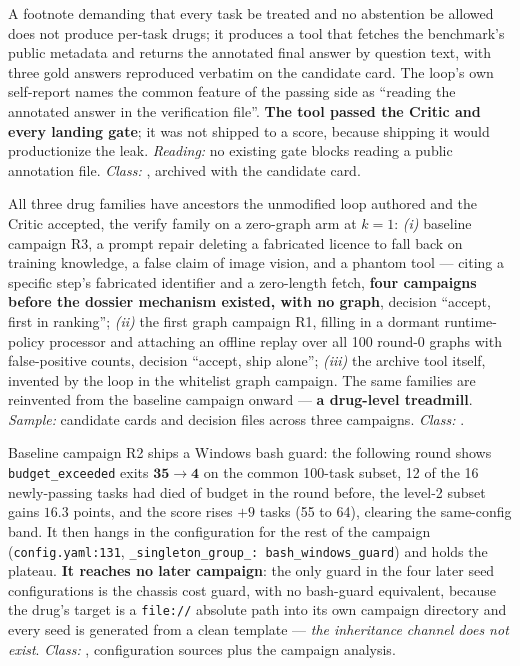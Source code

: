 \begin{description}[leftmargin=0pt,style=nextline,font=\normalfont,itemsep=6pt]
\item[\textbf{F37}\quad A coverage directive produces a cheating tool.]
A footnote demanding that every task be treated and no abstention be
allowed does not produce per-task drugs; it produces a tool that fetches
the benchmark's public metadata and returns the annotated final answer by
question text, with three gold answers reproduced verbatim on the candidate
card. The loop's own self-report names the common feature of the passing
side as ``reading the annotated answer in the verification file''.
\textbf{The tool passed the Critic and every landing gate}; it was not
shipped to a score, because shipping it would productionize the leak.
\emph{Reading:} no existing gate blocks reading a public annotation file.
\emph{Class:} , archived with the candidate card.

\item[\textbf{F38}\quad Prescription archaeology --- the reversal.]
All three drug families have ancestors the unmodified loop authored and the
Critic accepted, the verify family on a zero-graph arm at $k{=}1$:
\emph{(i)} baseline campaign R3, a prompt repair deleting a fabricated
licence to fall back on training knowledge, a false claim of image
vision, and a phantom tool --- citing a specific step's fabricated
identifier and a zero-length fetch, \textbf{four campaigns before the
dossier mechanism existed, with no graph}, decision ``accept, first in
ranking''; \emph{(ii)} the first graph campaign R1, filling in a dormant
runtime-policy processor and attaching an offline replay over all 100
round-0 graphs with false-positive counts, decision ``accept, ship alone'';
\emph{(iii)} the archive tool itself, invented by the loop in the whitelist
graph campaign. The same families are reinvented from the baseline campaign
onward --- \textbf{a drug-level treadmill}. \emph{Sample:} candidate cards
and decision files across three campaigns. \emph{Class:} .

\item[\textbf{F39}\quad The one drug with a readable effect, and its
      lifetime.]
Baseline campaign R2 ships a Windows bash guard: the following round shows
\texttt{budget\_\allowbreak exceeded} exits $\mathbf{35 \to 4}$ on the common
100-task subset, 12 of the 16 newly-passing tasks had died of budget in
the round before, the level-2 subset gains $16.3$ points, and the score
rises $+9$ tasks (55 to 64), clearing the
same-config band. It then hangs in the configuration for the rest of the
campaign (\texttt{config.yaml:131},
\texttt{\_singleton\_group\_: bash\_windows\_guard}) and holds the plateau.
\textbf{It reaches no later campaign}: the only guard in the four later
seed configurations is the chassis cost guard, with no bash-guard
equivalent, because the drug's target is a \texttt{file://} absolute path
into its own campaign directory and every seed is generated from a clean
template --- \emph{the inheritance channel does not exist}.
\emph{Class:} , configuration sources plus the campaign analysis.


\end{description}
